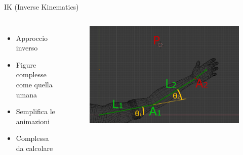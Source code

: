\documentclass[10pt]{beamer}
\begin{document}
\begin{frame}{IK (Inverse Kinematics)}					
  \begin{columns}[T,onlytextwidth]
		\begin{itemize}[<+- | alert@+>]							
    \item Approccio inverso											%
    \item Figure complesse come quella umana		%
		\item Semplifica le animazioni							%
    \item Complessa da calcolare                %
  \end{itemize}                                 %
    \begin{figure}
      \includegraphics[width=.9\linewidth]{figures/17}
    \end{figure}
  \end{columns}
\end{frame}
\end{document}
